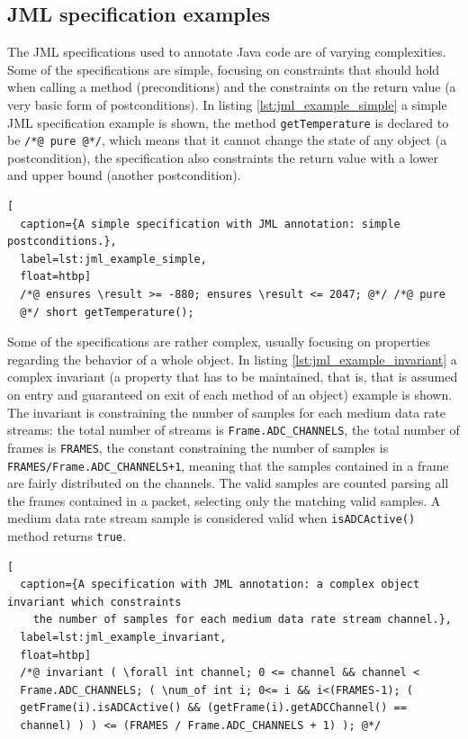 \documentclass{article} \usepackage{times}
\newcommand{\lil}[1]{\texttt{\lstinline|#1|}}
\begin{document}
\subsection{JML specification examples}
\label{subsec:a_jml_specification_example}

The JML specifications used to annotate Java code are of varying
complexities.  Some of the specifications are simple, focusing on
constraints that should hold when calling a method (preconditions) and
the constraints on the return value (a very basic form of
postconditions).  In listing \ref{lst:jml_example_simple} a simple JML
specification example is shown, the method \lil{getTemperature} is
declared to be \lil{/*@ pure @*/}, which means that it cannot change
the state of any object (a postcondition), the specification also
constraints the return value with a lower and upper bound (another
postcondition).

\begin{lstlisting}[
  caption={A simple specification with JML annotation: simple postconditions.},
  label=lst:jml_example_simple,
  float=htbp]
  /*@ ensures \result >= -880; ensures \result <= 2047; @*/ /*@ pure
  @*/ short getTemperature();
\end{lstlisting}

\sloppy

Some of the specifications are rather complex, usually focusing on
properties regarding the behavior of a whole object.  In listing
\ref{lst:jml_example_invariant} a complex invariant (a property that
has to be maintained, that is, that is assumed on entry and guaranteed
on exit of each method of an object) example is shown.  The invariant
is constraining the number of samples for each medium data rate
streams: the total number of streams is \lil{Frame.ADC_CHANNELS}, the
total number of frames is \lil{FRAMES}, the constant constraining the
number of samples is \lil{FRAMES/Frame.ADC_CHANNELS+1}, meaning that
the samples contained in a frame are fairly distributed on the
channels.  The valid samples are counted parsing all the frames
contained in a packet, selecting only the matching valid samples.  A
medium data rate stream sample is considered valid when
\lil{isADCActive()} method returns \lil{true}.

\fussy

\begin{lstlisting}[
  caption={A specification with JML annotation: a complex object invariant which constraints 
    the number of samples for each medium data rate stream channel.},
  label=lst:jml_example_invariant,
  float=htbp]
  /*@ invariant ( \forall int channel; 0 <= channel && channel <
  Frame.ADC_CHANNELS; ( \num_of int i; 0<= i && i<(FRAMES-1); (
  getFrame(i).isADCActive() && (getFrame(i).getADCChannel() ==
  channel) ) ) <= (FRAMES / Frame.ADC_CHANNELS + 1) ); @*/
\end{lstlisting}
\end{document}
